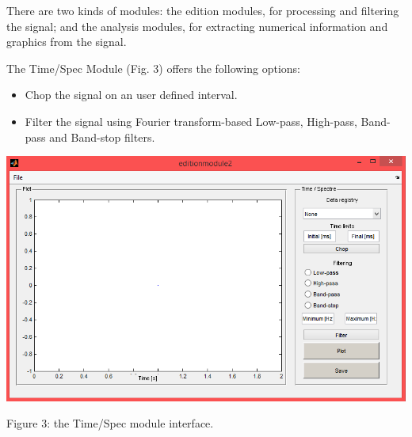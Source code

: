 \documentclass[12pt, a4paper]{article}
\begin{document}
There are two kinds of modules: the edition modules, for processing and filtering the signal; and the analysis modules, for extracting numerical information and graphics from the signal.

The Time/Spec Module (Fig. 3) offers the following options:
\begin{itemize}
\item Chop the signal on an user defined interval. 
\item Filter the signal using Fourier transform-based Low-pass, High-pass, Band-pass and Band-stop filters.
\end{itemize}
\begin{center}
\includegraphics[width=15cm]{timespec.png}

Figure 3: the Time/Spec module interface.
\end{center}
\end{document}
